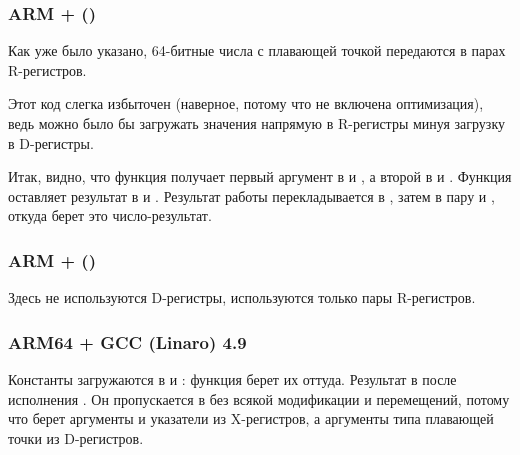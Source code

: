 \subsubsection{ARM + \NonOptimizingXcodeIV (\ThumbTwoMode)}
\label{FPU_passing_floats_ARM}



Как уже было указано, 64-битные числа с плавающей точкой передаются в парах R-регистров.

Этот код слегка избыточен (наверное, потому что не включена оптимизация), ведь можно было бы 
загружать значения напрямую в R-регистры минуя загрузку в D-регистры.

Итак, видно, что функция  получает первый аргумент в  и , а второй в  и . 
Функция оставляет результат в  и .
Результат работы  перекладывается в , 
затем в пару  и , откуда 
\printf берет это число-результат.

\subsubsection{ARM + \NonOptimizingKeilVI (\ARMMode)}



Здесь не используются D-регистры, используются только пары R-регистров.

\subsubsection{ARM64 + \Optimizing GCC (Linaro) 4.9}



Константы загружаются в  и : 
функция  берет их оттуда.
Результат в  после исполнения .
Он пропускается в \printf без всякой модификации и перемещений, 
потому что \printf берет аргументы  и указатели 
из X-регистров, а аргументы типа плавающей точки из D-регистров.

